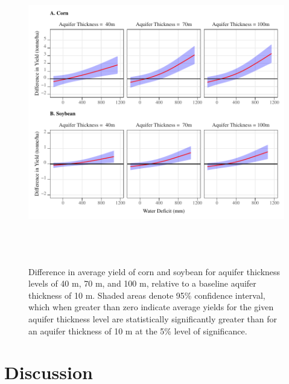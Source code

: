 \documentclass[
]{article}
\begin{document}
\begin{figure}[H]

{\centering \includegraphics[width=6in,height=500px,]{../../Figures/g_avg_yield_dif} 

}

\caption{Difference in average yield of corn and soybean for aquifer thickness levels of 40 m, 70 m, and 100 m, relative to a baseline aquifer thickness of 10 m. Shaded areas denote 95\% confidence interval, which when greater than zero indicate average yields for the given aquifer thickness level are statistically significantly greater than for an aquifer thickness of 10 m at the 5\% level of significance.}\label{fig:dif-tot-impact}
\end{figure}

\clearpage

\hypertarget{discussion}{%
\section{Discussion}\label{discussion}}
\end{document}
